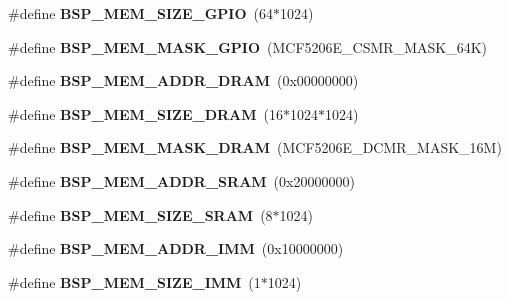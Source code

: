 \begin{DoxyCompactItemize}
\#define {\bfseries B\+S\+P\+\_\+\+M\+E\+M\+\_\+\+S\+I\+Z\+E\+\_\+\+G\+P\+IO}~(64$\ast$1024)
\item 
\mbox{\label{group__RTEMSBSPsM68kMCF5206Elite_ga7ac4f4a3692dbf448a5eae5adbd5dda0}} 
\#define {\bfseries B\+S\+P\+\_\+\+M\+E\+M\+\_\+\+M\+A\+S\+K\+\_\+\+G\+P\+IO}~(M\+C\+F5206\+E\+\_\+\+C\+S\+M\+R\+\_\+\+M\+A\+S\+K\+\_\+64K)
\item 
\mbox{\label{group__RTEMSBSPsM68kMCF5206Elite_gab2058d4e6e3043d1366cdbb630c93340}} 
\#define {\bfseries B\+S\+P\+\_\+\+M\+E\+M\+\_\+\+A\+D\+D\+R\+\_\+\+D\+R\+AM}~(0x00000000)
\item 
\mbox{\label{group__RTEMSBSPsM68kMCF5206Elite_gae582e21e44f52211612c88d2b48e5640}} 
\#define {\bfseries B\+S\+P\+\_\+\+M\+E\+M\+\_\+\+S\+I\+Z\+E\+\_\+\+D\+R\+AM}~(16$\ast$1024$\ast$1024)
\item 
\mbox{\label{group__RTEMSBSPsM68kMCF5206Elite_ga9b00775c54c2c52b322382bb8f460546}} 
\#define {\bfseries B\+S\+P\+\_\+\+M\+E\+M\+\_\+\+M\+A\+S\+K\+\_\+\+D\+R\+AM}~(M\+C\+F5206\+E\+\_\+\+D\+C\+M\+R\+\_\+\+M\+A\+S\+K\+\_\+16M)
\item 
\mbox{\label{group__RTEMSBSPsM68kMCF5206Elite_gae4a23eb7420382ac7d88760df18f7c30}} 
\#define {\bfseries B\+S\+P\+\_\+\+M\+E\+M\+\_\+\+A\+D\+D\+R\+\_\+\+S\+R\+AM}~(0x20000000)
\item 
\mbox{\label{group__RTEMSBSPsM68kMCF5206Elite_ga31984cf2cc448852b70d084959e63958}} 
\#define {\bfseries B\+S\+P\+\_\+\+M\+E\+M\+\_\+\+S\+I\+Z\+E\+\_\+\+S\+R\+AM}~(8$\ast$1024)
\item 
\mbox{\label{group__RTEMSBSPsM68kMCF5206Elite_ga392b1a9feefe54a092f34f25e52a6bbd}} 
\#define {\bfseries B\+S\+P\+\_\+\+M\+E\+M\+\_\+\+A\+D\+D\+R\+\_\+\+I\+MM}~(0x10000000)
\item 
\mbox{\label{group__RTEMSBSPsM68kMCF5206Elite_ga0b09a58675ece3dae4f2bf65a9020e7e}} 
\#define {\bfseries B\+S\+P\+\_\+\+M\+E\+M\+\_\+\+S\+I\+Z\+E\+\_\+\+I\+MM}~(1$\ast$1024)

\end{DoxyCompactItemize}
